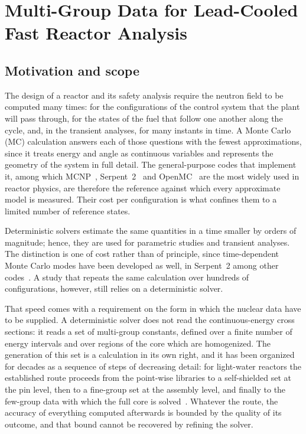 
\chapter{Multi-Group Data for Lead-Cooled Fast Reactor Analysis}\label{ch:part1-opener}

\section{Motivation and scope}

The design of a reactor and its safety analysis require the neutron field to be
computed many times: for the configurations of the control system that the
plant will pass through, for the states of the fuel that follow one another
along the cycle, and, in the transient analyses, for many instants
in time. A Monte Carlo (MC) calculation
answers each of those questions with the fewest approximations, since it treats
energy and angle as continuous variables and represents the geometry of the
system in full detail. The general-purpose codes that implement it, among which
MCNP~\cite{mcnp63}, Serpent~2~\cite{Serpent_code_description} and
OpenMC~\cite{openmc} are the most widely used in reactor physics, are therefore
the reference against which every approximate model is measured. Their cost per
configuration is what confines them to a limited number of reference states.

Deterministic solvers estimate the same quantities in a time smaller by orders
of magnitude; hence, they are used for parametric studies and transient
analyses. The distinction is one of cost rather than of principle,
since time-dependent Monte Carlo modes have been developed as well, in Serpent~2
among other codes~\cite{serpentDynamic}. A study that repeats the same
calculation over hundreds of configurations, however, still relies on a
deterministic solver.

That speed comes with a requirement on the form in which the nuclear data have
to be supplied. A deterministic solver does not read the continuous-energy cross
sections: it reads a set of multi-group constants, defined over a finite number
of energy intervals and over regions of the core which are homogenized. The
generation of this set is a calculation in its own right, and it has been
organized for decades as a sequence of steps of decreasing detail: for
light-water reactors the established route proceeds from the point-wise
libraries to a self-shielded set at the pin level, then to a fine-group set at
the assembly level, and finally to the few-group data with
which the full core is solved~\cite{cacuci2010handbook}. Whatever the route, the
accuracy of everything computed afterwards is bounded by the quality of its
outcome, and that bound cannot be recovered by refining the solver.

